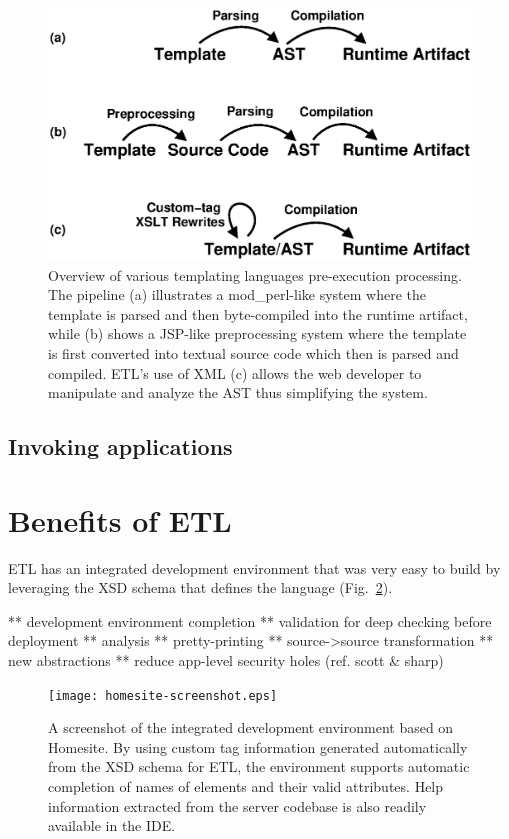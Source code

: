 \documentclass{www2003-submission}
\newcommand{\figref}[1]{Fig.~\ref{fig-#1}}
\begin{document}
\begin{figure}[tb]
\begin{centering}
\includegraphics[width=1\linewidth]{processing-stages-simple.eps}
\caption{Overview of various templating languages pre-execution
processing.  The pipeline (a) illustrates a mod\_perl-like system where
the template is parsed and then byte-compiled into the runtime
artifact, while (b) shows a JSP-like preprocessing system where the
template is first converted into textual source code which then is
parsed and compiled.  ETL's use of XML (c) allows the web developer to
manipulate and analyze the AST thus simplifying the system.
\label{fig-processing-stages}}
\end{centering}
\end{figure}


\subsection{Invoking applications}


\section{Benefits of ETL}
\label{sec-benefits}

ETL has an integrated development environment that was very
easy to build by leveraging the XSD schema that defines the language
(\figref{homesite-screenshot}).

** development environment completion
** validation for deep checking before deployment
** analysis 
** pretty-printing 
** source->source transformation 
** new abstractions 
** reduce app-level security holes (ref. scott \& sharp)



\begin{figure}[tb]
\begin{centering}
\hspace*{-0.05\linewidth}\texttt{[image: homesite-screenshot.eps]}
\caption{A screenshot of the integrated development environment based
on Homesite.  By using custom tag information generated automatically
from the XSD schema for ETL, the environment supports automatic
completion of names of elements and their valid attributes.  Help
information extracted from the server codebase is also readily
available in the IDE\@.
\label{fig-homesite-screenshot}}
\end{centering}
\end{figure}
\end{document}
